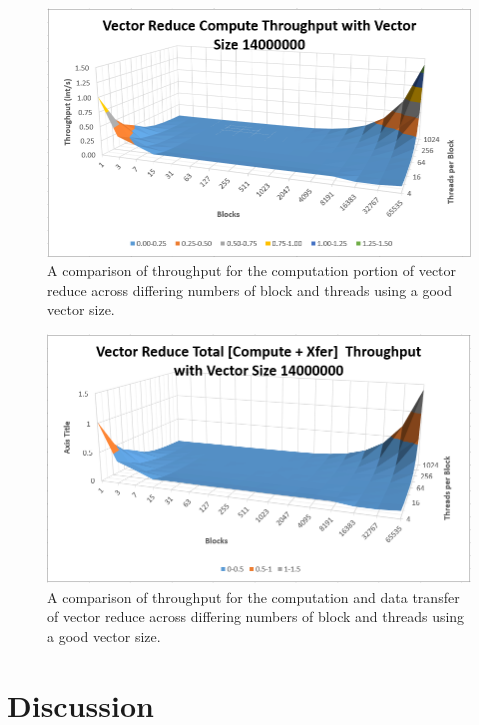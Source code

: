 \documentclass{article}
\begin{document}
  \begin{figure}[h]
    \centering
    \includegraphics[width=.9\linewidth]{compute_throughput_surface}
    \caption{A comparison of throughput for the computation portion of vector reduce across differing numbers of block and threads using a good vector size.}
    \label{fig:compute_throughput_surface}
  \end{figure}

  \begin{figure}[h]
    \centering
    \includegraphics[width=.9\linewidth]{total_throughput_surface}
    \caption{A comparison of throughput for the computation and data transfer of vector reduce across differing numbers of block and threads using a good vector size.}
    \label{fig:total_throughput_surface}
  \end{figure}

\newpage
\section{Discussion}
\end{document}
